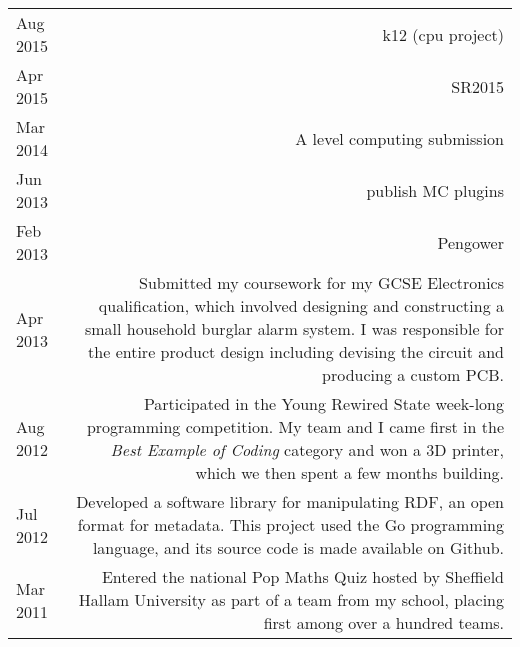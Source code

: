 

\begin{longtable}{L!{\sep}R}
    Aug 2015 & k12 (cpu project) \vspace{1.2em} \\

    Apr 2015 & SR2015 \vspace{1.2em} \\

    Mar 2014 & A level computing submission \vspace{1.2em} \\

    Jun 2013 & publish MC plugins \vspace{1.2em} \\

    Feb 2013 & Pengower \vspace{1.2em} \\

    Apr 2013 & Submitted my coursework for my GCSE Electronics qualification, which involved designing and constructing a small household burglar alarm system. I was responsible for the entire product design including devising the circuit and producing a custom PCB. \vspace{1.2em} \\

    Aug 2012 & Participated in the Young Rewired State week-long programming competition. My team and I came first in the \emph{Best Example of Coding} category and won a 3D printer, which we then spent a few months building. \vspace{1.2em} \\

    Jul 2012 & Developed a software library for manipulating RDF, an open format for metadata. This project used the Go programming language, and its source code is made available on Github. \vspace{1.2em} \\

    Mar 2011 & Entered the national Pop Maths Quiz hosted by Sheffield Hallam University as part of a team from my school, placing first among over a hundred teams. \\
\end{longtable}
